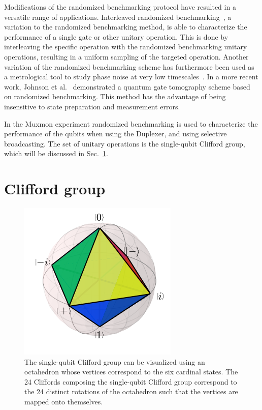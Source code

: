       Modifications of the randomized benchmarking protocol have resulted in a versatile range of applications. Interleaved randomized benchmarking~\cite{magesan2012efficient}, a variation to the randomized benchmarking method, is able to characterize the performance of a single gate or other unitary operation. This is done by interleaving the specific operation with the randomized benchmarking unitary operations, resulting in a uniform sampling of the targeted operation. Another variation of the randomized benchmarking scheme has furthermore been used as a metrological tool to study phase noise at very low timescales~\cite{omalley2015qubit}. In a more recent work, Johnson et al.~\cite{johnson2015demonstration} demonstrated a quantum gate tomography scheme based on randomized benchmarking. This method has the advantage of being insensitive to state preparation and measurement errors.

      In the Muxmon experiment randomized benchmarking is used to characterize the performance of the qubits when using the Duplexer, and using selective broadcasting. The set of unitary operations is the single-qubit Clifford group, which will be discussed in Sec.~\ref{sec:Clifford group}.
    \section{Clifford group}
      \label{sec:Clifford group}

      \begin{figure}[h]%
        \begin{center}
          \includegraphics[width=.5\textwidth]{Figures/Randomized benchmarking/Bloch sphere octahedron.png}
        \end{center}
        \caption{The single-qubit Clifford group can be visualized using an octahedron whose vertices correspond to the six cardinal states. The 24 Cliffords composing the single-qubit Clifford group correspond to the 24 distinct rotations of the octahedron such that the vertices are mapped onto themselves.}
        \label{fig:Clifford octahedron}
      \end{figure}

